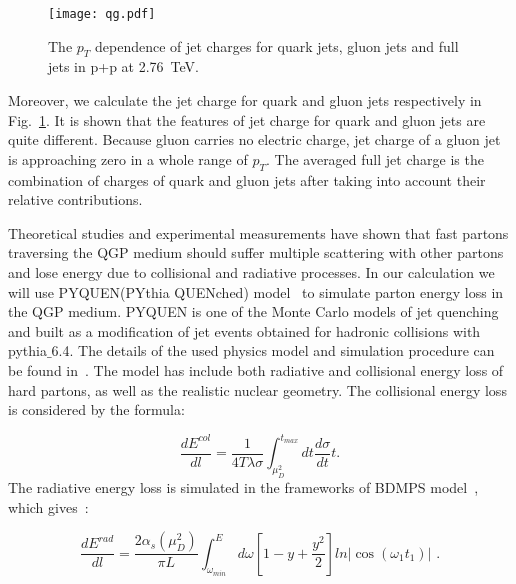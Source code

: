 \documentclass[3p,times,twocolumn]{elsarticle}
\begin{document}
\begin{figure}[!htb]
\centerline{
\texttt{[image: qg.pdf]}
}
\caption{The $p_T$ dependence of jet charges for quark jets, gluon jets and full jets in p+p at 2.76~TeV.}
\label{fig:qg}
\end{figure}

Moreover, we calculate the jet charge for quark and gluon jets respectively in Fig.~\ref{fig:qg}.
It is shown that the features of jet charge for quark and gluon jets are quite different. Because gluon carries no electric charge, jet charge of a gluon jet is approaching zero in a whole range of $p_T$. The averaged full jet charge
is the combination of charges of quark and gluon jets after taking into account their relative contributions.



Theoretical studies and experimental measurements
have shown that fast partons traversing the QGP medium should suffer multiple scattering with other partons and lose energy due
to collisional and radiative processes. In our calculation we will use PYQUEN(PYthia QUENched) model~\cite{Lokhtin:2005px} to simulate parton energy loss in the QGP medium.
PYQUEN is one of the Monte Carlo models
of jet quenching and built as a modification
of jet events obtained for hadronic collisions with
pythia$\_$6.4. The details of the used physics model
and simulation procedure can be found in~\cite{Lokhtin:2005px}.
The model has include both
radiative and collisional energy loss of hard partons, as well as the
realistic nuclear geometry.
The collisional energy loss is considered by the formula:

\begin{equation}
\label{collisional}
\frac{dE^{col}}{dl}=\frac{1}{4T\lambda\sigma}\int^{t_{max}}_{\mu^{2}_{D}}dt\frac{d\sigma}{dt}t.
\end{equation}
The radiative energy loss is simulated in the
frameworks of BDMPS model~\cite{Baier:1996sk,Baier:1996kr},
which gives~\cite{Lokhtin:2005px}:

\begin{equation}
\frac{dE^{rad}}{dl}=\frac{2\alpha_{s}(\mu^{2}_{D})}{\pi L}\int^{E}_{\omega_{min}}d\omega [1-y+\frac{y^{2}}{2}]
ln |\cos(\omega_{1}t_{1})| \,\, .
\end{equation}
\end{document}
